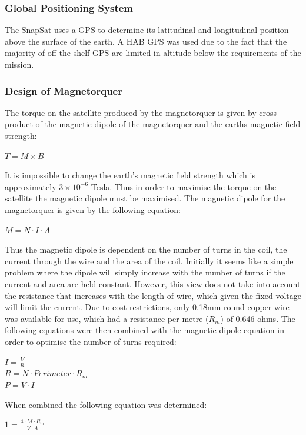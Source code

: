 \subsubsection{Global Positioning System}
The SnapSat uses a GPS to determine its latitudinal and longitudinal position above the surface of the earth.  A HAB GPS was used due to the fact that the majority of off the shelf GPS are limited in altitude below the requirements of the mission.
\subsubsection{Design of Magnetorquer}
The torque on the satellite produced by the magnetorquer is given by cross product of the magnetic dipole of the magnetorquer and the earths magnetic field strength: 
\begin{center}
    $T = M \times B$
\end{center}
It is impossible to change the earth's magnetic field strength which is approximately $3 \times 10^{-6}$ Tesla.  Thus in order to maximise the torque on the satellite the magnetic dipole must be maximised. The magnetic dipole for the magnetorquer is given by the following equation:
\begin{center}
    $M = N \cdot I \cdot A$
\end{center}
Thus the magnetic dipole is dependent on the number of turns in the coil, the current through the wire and the area of the coil.  Initially it seems like a simple problem where the dipole will simply increase with the number of turns if the current and area are held constant.  However, this view does not take into account the resistance that increases with the length of wire, which given the fixed voltage will limit the current.  Due to cost restrictions, only 0.18mm round copper wire was available for use, which had a resistance per metre ($R_m$) of 0.646 ohms.  The following equations were then combined with the magnetic dipole equation in order to optimise the number of turns required:
\begin{center}
    $I = \frac{V}{R}$\vspace{2mm}\\
    $R = N \cdot Perimeter \cdot R_m$ \vspace{2mm}\\
    $P = V \cdot I$
\end{center}
When combined the following equation was determined:
\begin{center}
    $1 = \frac{4 \cdot M \cdot R_m}{V \cdot A}$
\end{center}
